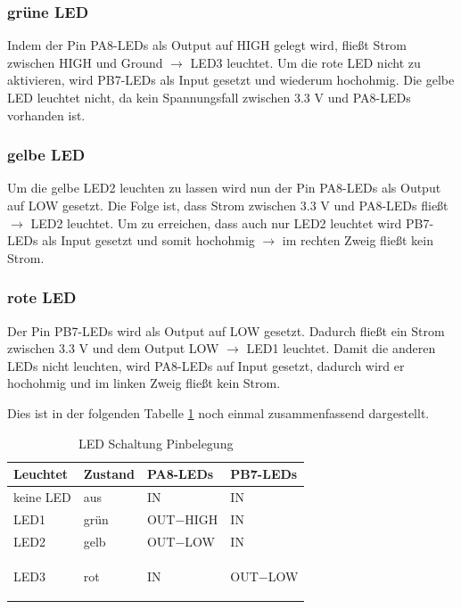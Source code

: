\documentclass[a4paper,
DIV=13,
12pt,
BCOR=10mm,
department=FakEI,
parskip=half,
automark,
]{article}
\begin{document}
\subsubsection{grüne LED}
Indem der Pin \glqq PA8-LEDs\grqq{} als Output auf \glqq HIGH\grqq{} gelegt wird, fließt Strom zwischen \glqq HIGH\grqq{} und Ground $\rightarrow$ LED3 leuchtet. Um die rote LED nicht zu aktivieren, wird \glqq PB7-LEDs\grqq{} als Input gesetzt und wiederum hochohmig. Die gelbe LED leuchtet nicht, da kein Spannungsfall zwischen 3.3 V und \glqq PA8-LEDs\grqq{} vorhanden ist.

\subsubsection{gelbe LED}
Um die gelbe LED2 leuchten zu lassen wird nun der Pin \glqq PA8-LEDs\grqq{} als Output auf \glqq LOW\grqq{} gesetzt. Die Folge ist, dass Strom zwischen 3.3 V und \glqq PA8-LEDs\grqq{} fließt $\rightarrow$ LED2 leuchtet. Um zu erreichen, dass auch nur LED2 leuchtet wird \glqq PB7-LEDs\grqq{} als Input gesetzt und somit hochohmig $\rightarrow$ im rechten Zweig fließt kein Strom.

\subsubsection{rote LED}
Der Pin \glqq PB7-LEDs\grqq{} wird als Output auf \glqq LOW\grqq{} gesetzt. Dadurch fließt ein Strom zwischen 3.3 V und dem Output \glqq LOW\grqq{} $\rightarrow$ LED1 leuchtet. Damit die anderen LEDs nicht leuchten, wird \glqq PA8-LEDs\grqq{} auf Input gesetzt, dadurch wird er hochohmig und im linken Zweig fließt kein Strom.


Dies ist in der folgenden Tabelle \ref{tab:ZusammenfassungderFunktionsweisederLEDSchaltung} noch einmal zusammenfassend dargestellt.

\begin{table}[h]
\begin{center}
\begin{tabularx}{\columnwidth}{XXXl}
Leuchtet &Zustand &PA8-LEDs &PB7-LEDs \\ \hline
keine LED & aus & IN & IN\\
LED1 & grün & OUT$-$HIGH & IN\\
LED2 & gelb & OUT$-$LOW &IN\\
LED3 & rot & IN &OUT$-$LOW

\label{tab:ZusammenfassungderFunktionsweisederLEDSchaltung}
\end{tabularx}
\end{center}
\caption{LED Schaltung Pinbelegung}
\end{table}
\end{document}
